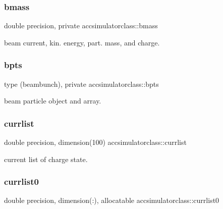 \subsubsection{\texorpdfstring{bmass}{bmass}}
{\footnotesize\ttfamily double precision, private accsimulatorclass\+::bmass\hspace{0.3cm}{\ttfamily [private]}}



beam current, kin. energy, part. mass, and charge. 

\mbox{\label{namespaceaccsimulatorclass_a4d06760340147c29a3ce5ba4f4ba9066}} 
\subsubsection{\texorpdfstring{bpts}{bpts}}
{\footnotesize\ttfamily type (beambunch), private accsimulatorclass\+::bpts\hspace{0.3cm}{\ttfamily [private]}}



beam particle object and array. 

\mbox{\label{namespaceaccsimulatorclass_a8c7c321579304f645389a08a8725f241}} 
\subsubsection{\texorpdfstring{currlist}{currlist}}
{\footnotesize\ttfamily double precision, dimension(100) accsimulatorclass\+::currlist}



current list of charge state. 

\mbox{\label{namespaceaccsimulatorclass_accc2494fdb269aeeba10e0f6eea90690}} 
\subsubsection{\texorpdfstring{currlist0}{currlist0}}
{\footnotesize\ttfamily double precision, dimension(\+:), allocatable accsimulatorclass\+::currlist0}

